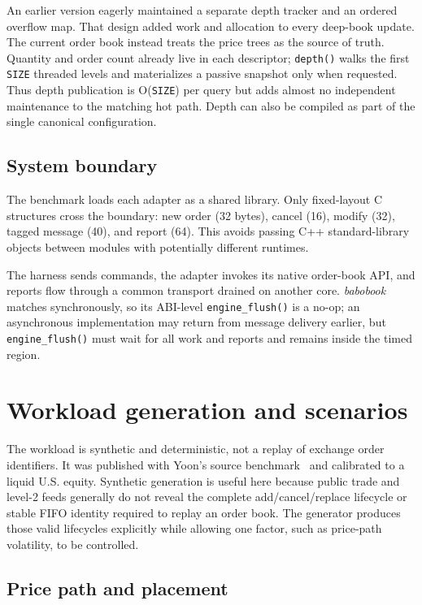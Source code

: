 \documentclass[10pt,twocolumn]{article}
\begin{document}
An earlier version eagerly maintained a separate depth tracker and an ordered
overflow map.  That design added work and allocation to every deep-book update.
The current order book instead treats the price trees as the source of truth.
Quantity and order count already live in each descriptor; \texttt{depth()} walks
the first \texttt{SIZE} threaded levels and materializes a passive snapshot only
when requested.  Thus depth publication is O(\texttt{SIZE}) per query but adds
almost no independent maintenance to the matching hot path.  Depth can also be
compiled as part of the single canonical configuration.

\subsection{System boundary}

The benchmark loads each adapter as a shared library.  Only fixed-layout C
structures cross the boundary: new order (32 bytes), cancel (16), modify (32),
tagged message (40), and report (64).  This avoids passing C++ standard-library
objects between modules with potentially different runtimes.

The harness sends commands, the adapter invokes its native order-book API, and reports
flow through a common transport drained on another core.  \textit{babobook} matches
synchronously, so its ABI-level \texttt{engine\_flush()} is a no-op; an asynchronous implementation
may return from message delivery earlier, but \texttt{engine\_flush()} must wait
for all work and reports and remains inside the timed region.

\section{Workload generation and scenarios}

The workload is synthetic and deterministic, not a replay of exchange order
identifiers.  It was published with Yoon's source benchmark~\cite{yoon2026} and calibrated to a
liquid U.S. equity.  Synthetic generation is useful here because public trade
and level-2 feeds generally do not reveal the complete add/cancel/replace
lifecycle or stable FIFO identity required to replay an order book.  The
generator produces those valid lifecycles explicitly while allowing one factor,
such as price-path volatility, to be controlled.

\subsection{Price path and placement}
\end{document}
